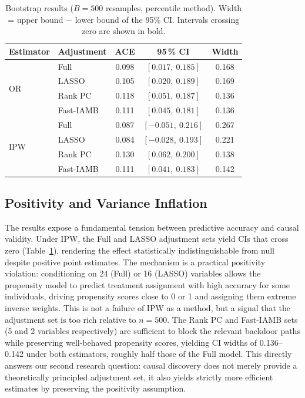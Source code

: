 \documentclass[11pt, a4paper]{article}
\theoremstyle{definition}
\begin{document}
\begin{table}[H]
    \centering
    \caption{Bootstrap results ($B = 500$ resamples, percentile method). Width = upper
    bound $-$ lower bound of the 95\% CI. Intervals crossing zero are shown in bold.}
    \label{tab:bootstrap-results}
    \small
    \begin{tabular}{llccc}
        \toprule
        \textbf{Estimator} & \textbf{Adjustment} & \textbf{ACE} &
        \textbf{95\,\% CI} & \textbf{Width} \\
        \midrule
        \multirow{4}{*}{OR}
                             & Full      & 0.098 & $[0.017,\ 0.185]$          & 0.168 \\
                             & LASSO     & 0.105 & $[0.020,\ 0.189]$          & 0.169 \\
                             & Rank PC   & 0.118 & $[0.051,\ 0.187]$          & 0.136 \\
                             & Fast-IAMB & 0.111 & $[0.045,\ 0.181]$          & 0.136 \\
        \midrule
        \multirow{4}{*}{IPW}
                             & Full      & 0.087 & $\mathbf{[-0.051,\ 0.216]}$& 0.267 \\
                             & LASSO     & 0.084 & $\mathbf{[-0.028,\ 0.193]}$& 0.221 \\
                             & Rank PC   & 0.130 & $[0.062,\ 0.200]$          & 0.138 \\
                             & Fast-IAMB & 0.111 & $[0.041,\ 0.183]$          & 0.142 \\
        \bottomrule
    \end{tabular}
\end{table}

\subsection{Positivity and Variance Inflation}

The results expose a fundamental tension between predictive accuracy and causal validity.
Under IPW, the Full and LASSO adjustment sets yield CIs that cross zero
(Table~\ref{tab:bootstrap-results}), rendering the effect statistically indistinguishable
from null despite positive point estimates. The mechanism is a practical positivity
violation: conditioning on 24 (Full) or 16 (LASSO) variables allows the propensity model
to predict treatment assignment with high accuracy for some individuals, driving propensity
scores close to 0 or 1 and assigning them extreme inverse weights. This is not a failure of
IPW as a method, but a signal that the adjustment set is too rich relative to $n = 500$.
The Rank PC and Fast-IAMB sets (5 and 2 variables respectively) are sufficient to block the
relevant backdoor paths while preserving well-behaved propensity scores, yielding CI widths
of 0.136--0.142 under both estimators, roughly half those of the Full model. This directly
answers our second research question: causal discovery does not merely provide a theoretically
principled adjustment set, it also yields strictly more efficient estimates by preserving the
positivity assumption.
\end{document}
